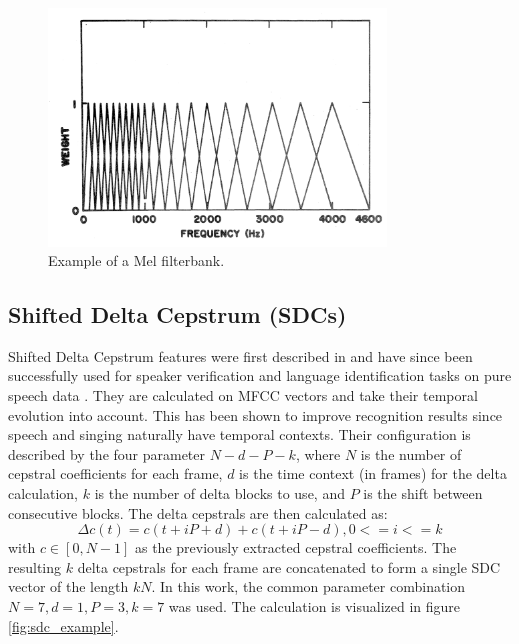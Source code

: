 \begin{figure}
	\begin{center}
		\includegraphics[width=0.8\textwidth]{images/mel_filterbanks.png}
		\caption{Example of a Mel filterbank. \cite{davis_mermelstein}}
		\label{fig:mel_filterbanks}
	\end{center}
\end{figure}



\subsection{Shifted Delta Cepstrum (SDCs)} 
Shifted Delta Cepstrum features were first described in \cite{bielefeld} and have since been successfully used for speaker verification and language identification tasks on pure speech data \cite{torres} \cite{campbell} \cite{allen}. They are calculated on MFCC vectors and take their temporal evolution into account. This has been shown to improve recognition results since speech and singing naturally have temporal contexts. Their configuration is described by the four parameter $N-d-P-k$, where $N$ is the number of cepstral coefficients for each frame, $d$ is the time context (in frames) for the delta calculation, $k$ is the number of delta blocks to use, and $P$ is the shift between consecutive blocks. The delta cepstrals are then calculated as:
\begin{equation}
\Delta c(t) = c(t+iP+d)+c(t+iP-d), 0<=i<=k
\end{equation}
with $c \in [0, N-1]$ as the previously extracted cepstral coefficients. The resulting $k$ delta cepstrals for each frame are concatenated to form a single SDC vector of the length $kN$. In this work, the common parameter combination $N=7, d=1, P=3, k=7$ was used. The calculation is visualized in figure \ref{fig:sdc_example}.

